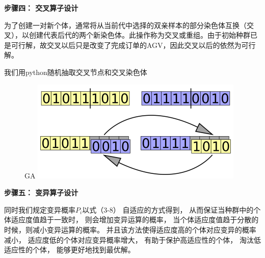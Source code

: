 \documentclass{article}
\begin{document}
	\textbf{步骤四： 交叉算子设计}
	
	为了创建一对新个体，通常将从当前代中选择的双亲样本的部分染色体互换（交叉），以创建代表后代的两个新染色体。此操作称为交叉或重组。由于初始种群已是可行解，故交叉以后只是改变了完成订单的AGV，因此交叉以后的依然为可行解。
	
	我们用python随机抽取交叉节点和交叉染色体
	\begin{figure}GA
		\centering
		\includegraphics[]{GA1.png}
	\end{figure}
	
	
	\textbf{步骤五： 变异算子设计}
	
	
	同时我们规定变异概率$P_i$以式（3-8） 自适应的方式得到， 从而保证当种群中的个体适应度值趋于一致时， 则会增加变异运算的概率， 当个体适应度值趋于分散的时候，则减小变异运算的概率。 并且该方法使得适应度高的个体对应变异的概率减小， 适应度低的个体对应变异概率增大， 有助于保护高适应性的个体， 淘汰低适应性的个体， 能够更好地找到最优解。
	
\end{document}
